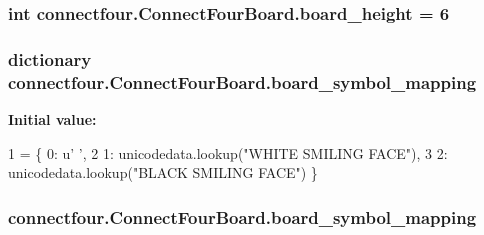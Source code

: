 \subsubsection[{board\+\_\+height}]{\setlength{\rightskip}{0pt plus 5cm}int connectfour.\+Connect\+Four\+Board.\+board\+\_\+height = 6\hspace{0.3cm}{\ttfamily [static]}}\label{classconnectfour_1_1_connect_four_board_a31a0129e0fd919af299f88e82a44348f}
\hypertarget{classconnectfour_1_1_connect_four_board_a939160228737190efd67695aea4e08f1}{}
\subsubsection[{board\+\_\+symbol\+\_\+mapping}]{\setlength{\rightskip}{0pt plus 5cm}dictionary connectfour.\+Connect\+Four\+Board.\+board\+\_\+symbol\+\_\+mapping\hspace{0.3cm}{\ttfamily [static]}}\label{classconnectfour_1_1_connect_four_board_a939160228737190efd67695aea4e08f1}
{\bfseries Initial value\+:}
\begin{DoxyCode}
1 = \{ 0: \textcolor{stringliteral}{u' '},
2                              1: unicodedata.lookup(\textcolor{stringliteral}{"WHITE SMILING FACE"}),
3                              2: unicodedata.lookup(\textcolor{stringliteral}{"BLACK SMILING FACE"}) \}
\end{DoxyCode}
\hypertarget{classconnectfour_1_1_connect_four_board_ae28d1dac88e83fb944b018976f719cef}{}
\subsubsection[{board\+\_\+symbol\+\_\+mapping}]{\setlength{\rightskip}{0pt plus 5cm}connectfour.\+Connect\+Four\+Board.\+board\+\_\+symbol\+\_\+mapping}\label{classconnectfour_1_1_connect_four_board_ae28d1dac88e83fb944b018976f719cef}
\hypertarget{classconnectfour_1_1_connect_four_board_a7d5a560c3dde1e17eae92e13ce03f32a}{}
